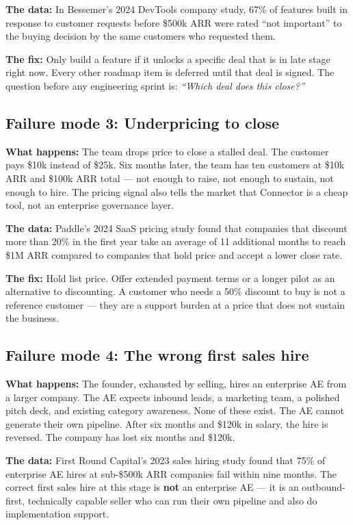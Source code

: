 \textbf{The data:} In Bessemer's 2024 DevTools company study, 67\% of features
built in response to customer requests before \$500k ARR were rated ``not
important'' to the buying decision by the same customers who requested them.

\textbf{The fix:} Only build a feature if it unlocks a specific deal that is in
late stage right now. Every other roadmap item is deferred until that deal is
signed. The question before any engineering sprint is: \textit{``Which deal does
this close?''}

\subsection{Failure mode 3: Underpricing to close}

\textbf{What happens:} The team drops price to close a stalled deal. The
customer pays \$10k instead of \$25k. Six months later, the team has ten
customers at \$10k ARR and \$100k ARR total — not enough to raise, not enough
to sustain, not enough to hire. The pricing signal also tells the market that
Connector is a cheap tool, not an enterprise governance layer.

\textbf{The data:} Paddle's 2024 SaaS pricing study found that companies that
discount more than 20\% in the first year take an average of 11 additional
months to reach \$1M ARR compared to companies that hold price and accept a
lower close rate.

\textbf{The fix:} Hold list price. Offer extended payment terms or a longer
pilot as an alternative to discounting. A customer who needs a 50\% discount
to buy is not a reference customer — they are a support burden at a price that
does not sustain the business.

\subsection{Failure mode 4: The wrong first sales hire}

\textbf{What happens:} The founder, exhausted by selling, hires an enterprise
AE from a larger company. The AE expects inbound leads, a marketing team, a
polished pitch deck, and existing category awareness. None of these exist. The
AE cannot generate their own pipeline. After six months and \$120k in salary,
the hire is reversed. The company has lost six months and \$120k.

\textbf{The data:} First Round Capital's 2023 sales hiring study found that
75\% of enterprise AE hires at sub-\$500k ARR companies fail within nine months.
The correct first sales hire at this stage is \textbf{not} an enterprise AE —
it is an outbound-first, technically capable seller who can run their own
pipeline and also do implementation support.

